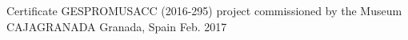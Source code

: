 



\begin{cvhonors}

  \cvhonor
    {Certificate} %
    {GESPROMUSACC (2016-295) project commissioned by the Museum CAJAGRANADA} %
    {Granada, Spain} %
    {Feb. 2017} %

\end{cvhonors}
